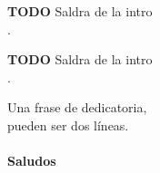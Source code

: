 \documentclass[
	spanish, %
	letterpaper, oneside
]{book}
\begin{document}
\templatePortrait

\templatePagecfg

\begin{abstractd}
	\textbf{TODO} Saldra de la intro \\.
	\lipsum[1]
\end{abstractd}

\begin{abstractdesp}
	\textbf{TODO} Saldra de la intro \\.
	\lipsum[1]
\end{abstractdesp}

\begin{dedicatory}
	Una frase de dedicatoria, \\
	pueden ser dos líneas. \\
	~ \\
	\textbf{Saludos}
\end{dedicatory}

\begin{acknowledgments}
	\lipsum[1]
\end{acknowledgments}

\templateIndex

\templateFinalcfg











\typeout{}



\end{document}
